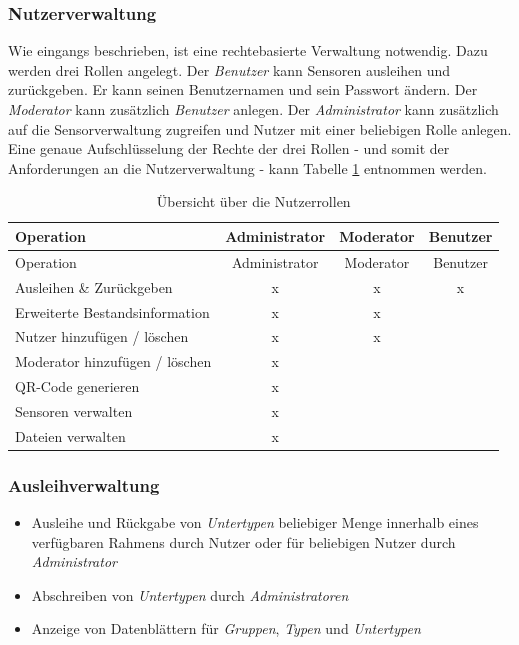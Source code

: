 \documentclass[
]{article}
\providecommand{\tightlist}{%
  \setlength{\itemsep}{0pt}\setlength{\parskip}{0pt}}
\begin{document}
\hypertarget{nutzerverwaltung}{%
\subsubsection{Nutzerverwaltung}\label{nutzerverwaltung}}

Wie eingangs beschrieben, ist eine rechtebasierte Verwaltung notwendig. Dazu werden drei Rollen angelegt. Der \emph{Benutzer} kann Sensoren ausleihen und zurückgeben. Er kann seinen Benutzernamen und sein Passwort ändern. Der \emph{Moderator} kann zusätzlich \emph{Benutzer} anlegen. Der \emph{Administrator} kann zusätzlich auf die Sensorverwaltung zugreifen und Nutzer mit einer beliebigen Rolle anlegen. Eine genaue Aufschlüsselung der Rechte der drei Rollen - und somit der Anforderungen an die Nutzerverwaltung - kann Tabelle \ref{tab:user-rights} entnommen werden.

\begin{longtable}[]{@{}lccc@{}}
\caption{\label{tab:user-rights} Übersicht über die Nutzerrollen}\tabularnewline
\toprule
Operation & Administrator & Moderator & Benutzer \\
\midrule
\endfirsthead
\toprule
Operation & Administrator & Moderator & Benutzer \\
\midrule
\endhead
Ausleihen \& Zurückgeben & x & x & x \\
Erweiterte Bestandsinformation & x & x & \\
Nutzer hinzufügen / löschen & x & x & \\
Moderator hinzufügen / löschen & x & & \\
QR-Code generieren & x & & \\
Sensoren verwalten & x & & \\
Dateien verwalten & x & & \\
\bottomrule
\end{longtable}

\hypertarget{ausleihverwaltung}{%
\subsubsection{Ausleihverwaltung}\label{ausleihverwaltung}}

\begin{itemize}
\tightlist
\item
  Ausleihe und Rückgabe von \emph{Untertypen} beliebiger Menge innerhalb eines verfügbaren Rahmens durch Nutzer oder für beliebigen Nutzer durch \emph{Administrator}
\item
  Abschreiben von \emph{Untertypen} durch \emph{Administratoren}
\item
  Anzeige von Datenblättern für \emph{Gruppen}, \emph{Typen} und \emph{Untertypen}
\end{itemize}
\end{document}
